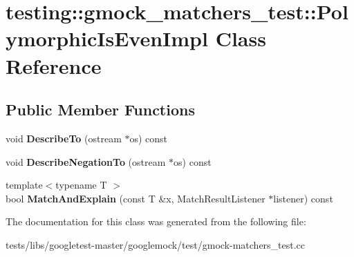 \hypertarget{classtesting_1_1gmock__matchers__test_1_1PolymorphicIsEvenImpl}{}\section{testing\+:\+:gmock\+\_\+matchers\+\_\+test\+:\+:Polymorphic\+Is\+Even\+Impl Class Reference}
\label{classtesting_1_1gmock__matchers__test_1_1PolymorphicIsEvenImpl}
\subsection*{Public Member Functions}
\begin{DoxyCompactItemize}
\item 
\mbox{\label{classtesting_1_1gmock__matchers__test_1_1PolymorphicIsEvenImpl_ac07eb9f72db98b4b5489a139e844394c}} 
void {\bfseries Describe\+To} (ostream $\ast$os) const
\item 
\mbox{\label{classtesting_1_1gmock__matchers__test_1_1PolymorphicIsEvenImpl_a2e873630451f3cf6cad5bf6f82e00a33}} 
void {\bfseries Describe\+Negation\+To} (ostream $\ast$os) const
\item 
\mbox{\label{classtesting_1_1gmock__matchers__test_1_1PolymorphicIsEvenImpl_ab8d500c4d6c57645527fc367acf6189e}} 
{\footnotesize template$<$typename T $>$ }\\bool {\bfseries Match\+And\+Explain} (const T \&x, Match\+Result\+Listener $\ast$listener) const
\end{DoxyCompactItemize}


The documentation for this class was generated from the following file\+:\begin{DoxyCompactItemize}
\item 
tests/libs/googletest-\/master/googlemock/test/gmock-\/matchers\+\_\+test.\+cc\end{DoxyCompactItemize}
